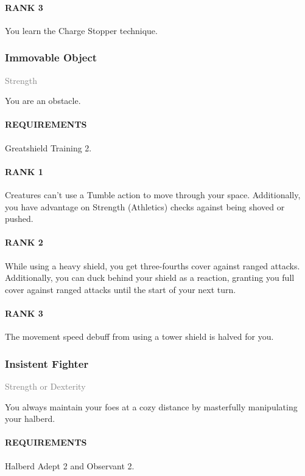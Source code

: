 \paragraph{RANK 3} You learn the Charge Stopper technique.

\subsubsection{Immovable Object} \label{feat::immovableobject}
\small{\textcolor{gray}{Strength}}

\normalsize
You are an obstacle.
\paragraph{REQUIREMENTS} Greatshield Training 2.
\paragraph{RANK 1} Creatures can't use a Tumble action to move through your space.
Additionally, you have advantage on Strength (Athletics) checks against being shoved or pushed.
\paragraph{RANK 2} While using a heavy shield, you get three-fourths cover against ranged attacks.
Additionally, you can duck behind your shield as a reaction, granting you full cover against ranged attacks until the start of your next turn.
\paragraph{RANK 3} The movement speed debuff from using a tower shield is halved for you.

\subsubsection{Insistent Fighter} \label{feat::insistentfighter}
\small{\textcolor{gray}{Strength or Dexterity}}

\normalsize
You always maintain your foes at a cozy distance by masterfully manipulating your halberd.
\paragraph{REQUIREMENTS} Halberd Adept 2 and Observant 2.
